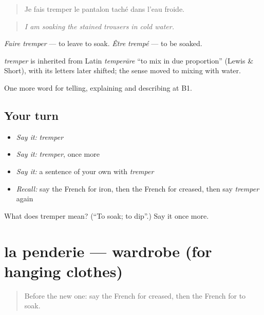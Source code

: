 \begin{quote}
Je fais tremper le pantalon taché dans l'eau froide.
\end{quote}

\begin{quote}
\emph{I am soaking the stained trousers in cold water.}
\end{quote}

\emph{Faire tremper} — to leave to soak. \emph{Être trempé} — to be soaked.

\begin{cousinweb}
\emph{tremper} is inherited from Latin \emph{temperāre} \textquotedblleft{}to mix in due proportion\textquotedblright{} (Lewis \& Short), with its letters later shifted; the sense moved to mixing with water.
\end{cousinweb}

\begin{grammarlens}[title={What you've built}]
One more word for telling, explaining and describing at B1.
\end{grammarlens}

\subsection*{Your turn}
\begin{itemize}
\raggedright
  \item \emph{Say it:} \emph{tremper}
  \item \emph{Say it:} \emph{tremper}, once more
  \item \emph{Say it:} a sentence of your own with \emph{tremper}
  \item \emph{Recall:} say the French for iron, then the French for creased, then say \emph{tremper} again
\end{itemize}

\begin{tcolorbox}[breakable,colback=teal!4,colframe=teal!35!black,title={Before you move on}]
What does tremper mean? (\textquotedblleft{}To soak; to dip\textquotedblright{}.) Say it once more.
\end{tcolorbox}
\section[la penderie]{la penderie — wardrobe (for hanging clothes)}

\label{lesson:FR-C527-penderie}



\begin{quote}
Before the new one: say the French for creased, then the French for to soak.
\end{quote}

